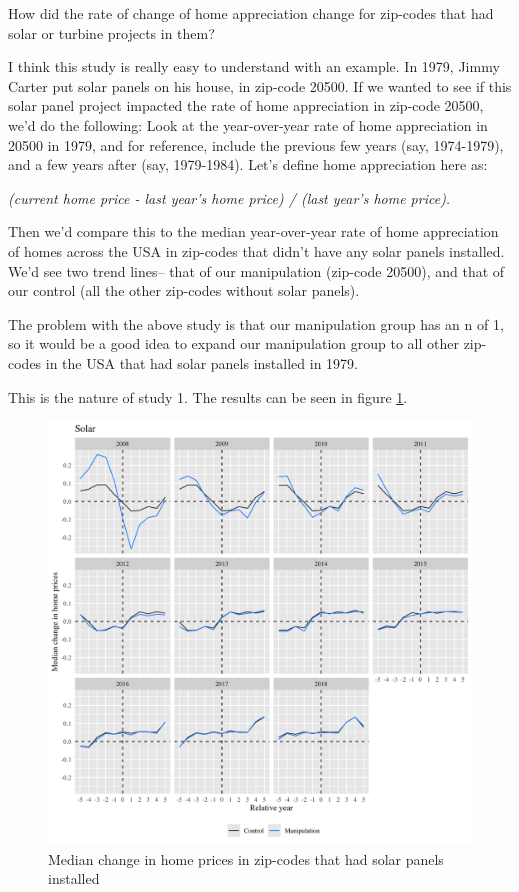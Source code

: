 \documentclass{article}
\begin{document}
How did the rate of change of home appreciation change for zip-codes that had solar or turbine projects in them?

I think this study is really easy to understand with an example.
In 1979, Jimmy Carter put solar panels on his house, in zip-code 20500.
If we wanted to see if this solar panel project impacted the rate of home appreciation in zip-code 20500, we'd do the following:
Look at the year-over-year rate of home appreciation in 20500 in 1979, and for reference, include the previous few years (say, 1974-1979), and a few years after (say, 1979-1984).
Let's define home appreciation here as:

\noindent\textit{(current home price - last year's home price) / (last year's home price). }

Then we'd compare this to the median year-over-year rate of home appreciation of homes across the USA in zip-codes that didn't have any solar panels installed.
We'd see two trend lines-- that of our manipulation (zip-code 20500), and that of our control (all the other zip-codes without solar panels).

The problem with the above study is that our manipulation group has an n of 1, so it would be a good idea to expand our manipulation group to all other zip-codes in the USA that had solar panels installed in 1979.

This is the nature of study 1.
The results can be seen in figure \ref{study1solarfacets}.
\begin{figure}[h]
\centering
\includegraphics[width=0.9\linewidth]
{study1_solar_facets.png} 
\caption{Median change in home prices in zip-codes that had solar panels installed}
\label{study1solarfacets}
\end{figure}
\end{document}
